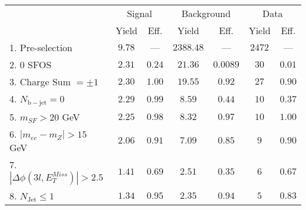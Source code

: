 \begin{tabular}{l||c|c||c|c||c|c}
\hline
 &                 \multicolumn{2}{c||}{Signal}            &  \multicolumn{2}{c||}{Background} &  \multicolumn{2}{c}{Data} \\
  & Yield & Eff. & Yield & Eff. & Yield & Eff.\\
  \hline\hline
  1. Pre-selection &  $9.78$ & --- &  $2388.48$ & --- & $2472$ &  --- \\ 
  \hline
  2. 0 SFOS &  $2.31$ &  $0.24$ &  $21.36$ &  $0.0089$ & $30$ &  $0.01$\\ 
  \hline
  3. Charge Sum $= \pm 1$ &  $2.30$ &  $1.00$ &  $19.55$ &  $0.92$ & $27$ &  $0.90$\\ 
  \hline
  4. $N_{\mathrm{b-jet}} = 0$ &  $2.29$ &  $0.99$ &  $8.59$ &  $0.44$ & $10$ &  $0.37$\\ 
  \hline
  5. $m_{SF} > 20$ GeV &  $2.25$ &  $0.98$ &  $8.32$ &  $0.97$ & $10$ &  $1.00$\\ 
  \hline
  6. $|m_{ee} - m_{Z}| > 15$ GeV &  $2.06$ &  $0.91$ &  $7.09$ &  $0.85$ & $9$ &  $0.90$\\ 
  \hline
  7. $|\Delta\phi(3l,E_{T}^{Miss})| > 2.5$ &  $1.41$ &  $0.69$ &  $2.51$ &  $0.35$ & $6$ &  $0.67$\\ 
  \hline
  8. $N_{\mathrm{Jet}} \leq 1$ &  $1.34$ &  $0.95$ &  $2.35$ &  $0.94$ & $5$ &  $0.83$\\ 
  \hline
  \end{tabular}


